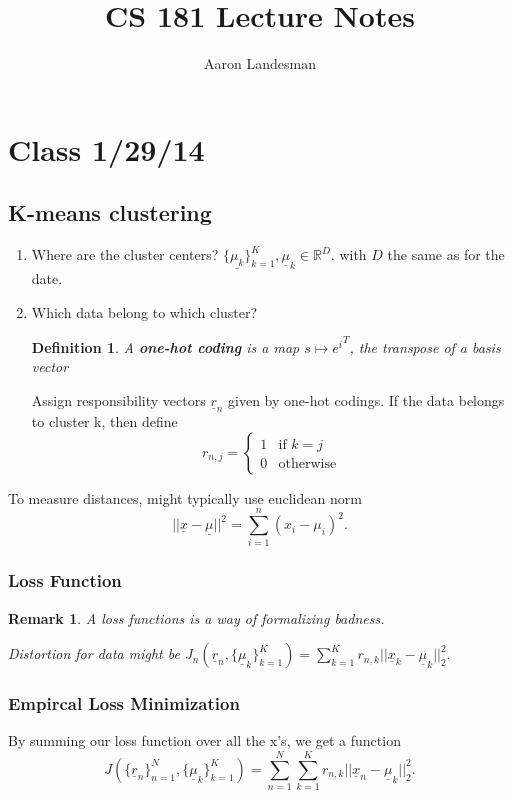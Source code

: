 \documentclass{amsart}
\title{CS 181 Lecture Notes}
\author{Aaron Landesman}
\newtheorem{defn}[subsubsection]{Definition}
\newtheorem{rem}[subsubsection]{Remark}
\begin{document}
\maketitle

\tableofcontents

\section{Class 1/29/14}

\subsection{K-means clustering}

\begin{enumerate}
\item Where are the cluster centers? $\{\underline{\mu_k}\}_{k=1}^K, \underline{\mu}_k \in \mathbb R^D.$ with $D$ the same as for the date.

\item Which data belong to which cluster? 
\begin{defn} A {\bfseries one-hot coding} is a map $s\mapsto {e^i}^T$, the transpose of a basis vector \end{defn}
Assign responsibility vectors $\underline r_n$ given by one-hot codings. If the data belongs to cluster k, then define
$$r_{n,j} = \begin{cases} 1 &\mbox{if } k=j \\ 0 &\mbox{otherwise} \end{cases}$$
\end{enumerate}
To measure distances, might typically use euclidean norm
$$||\underline x - \underline \mu||^2 = \sum_{i=1}^n (x_i - \mu_i)^2.$$

\subsubsection{Loss Function}
\begin{rem}
A loss functions is a way of formalizing badness.

Distortion for data might be $J_n(\underline r_n, \{\underline \mu_k \}_{k=1}^K) = \sum_{k=1}^K r_{n,k} ||\underline x_k - \underline \mu_k ||_2^2.$
\end{rem}

\subsubsection{Empircal Loss Minimization}
By summing our loss function over all the x's, we get a function
$$J(\{\underline r_n\}_{n=1}^N, \{\underline \mu_k\}_{k=1}^K) = \sum_{n=1}^N \sum_{k=1}^K r_{n,k} || \underline x_n - \underline \mu_k||_2^2.$$
\end{document}
